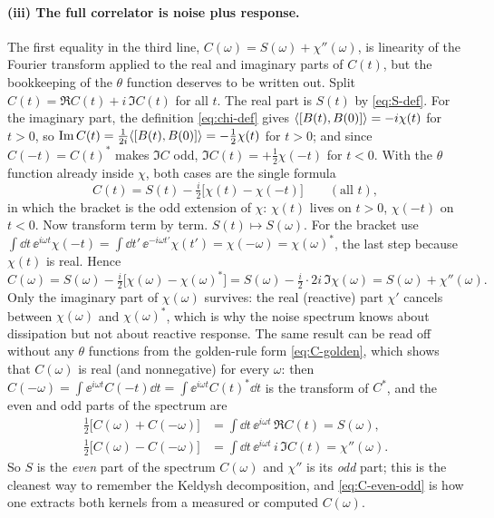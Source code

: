 \paragraph{(iii) The full correlator is noise plus response.}
The first equality in the third line, $C(\omega)=S(\omega)+\chi''(\omega)$, is linearity of the Fourier transform applied to the real and imaginary parts of $C(t)$, but the bookkeeping of the $\theta$ function deserves to be written out.
Split $C(t)=\Re C(t)+i\,\Im C(t)$ for all $t$.
The real part is $S(t)$ by \cref{eq:S-def}.
For the imaginary part, the definition \eqref{eq:chi-def} gives $\langle[B(t),B(0)]\rangle=-i\chi(t)$ for $t>0$, so $\operatorname{Im} C(t)=\tfrac{1}{2i}\langle[B(t),B(0)]\rangle=-\tfrac12\chi(t)$ for $t>0$; and since $C(-t)=C(t)^*$ makes $\Im C$ odd, $\Im C(t)=+\tfrac12\chi(-t)$ for $t<0$.
With the $\theta$ function already inside $\chi$, both cases are the single formula
\begin{equation}
  C(t)=S(t)-\tfrac i2\big[\chi(t)-\chi(-t)\big]\qquad(\text{all }t),
  \label{eq:C-split}
\end{equation}
in which the bracket is the odd extension of $\chi$: $\chi(t)$ lives on $t>0$, $\chi(-t)$ on $t<0$.
Now transform term by term.
$S(t)\mapsto S(\omega)$.
For the bracket use $\int\dd t\,\ee^{i\omega t}\chi(-t)=\int\dd t'\,\ee^{-i\omega t'}\chi(t')=\chi(-\omega)=\chi(\omega)^*$, the last step because $\chi(t)$ is real.
Hence
\begin{equation}
  C(\omega)=S(\omega)-\tfrac i2\big[\chi(\omega)-\chi(\omega)^*\big]=S(\omega)-\tfrac i2\cdot2i\,\Im\chi(\omega)=S(\omega)+\chi''(\omega).
\end{equation}
Only the imaginary part of $\chi(\omega)$ survives: the real (reactive) part $\chi'$ cancels between $\chi(\omega)$ and $\chi(\omega)^*$, which is why the noise spectrum knows about dissipation but not about reactive response.
The same result can be read off without any $\theta$ functions from the golden-rule form \eqref{eq:C-golden}, which shows that $C(\omega)$ is real (and nonnegative) for every $\omega$: then $C(-\omega)=\int\ee^{i\omega t}C(-t)\dd t=\int\ee^{i\omega t}C(t)^*\dd t$ is the transform of $C^*$, and the even and odd parts of the spectrum are
\begin{equation}
\begin{aligned}
  \tfrac12\big[C(\omega)+C(-\omega)\big]&=\int\!\dd t\,\ee^{i\omega t}\,\Re C(t)=S(\omega),\\
  \tfrac12\big[C(\omega)-C(-\omega)\big]&=\int\!\dd t\,\ee^{i\omega t}\,i\,\Im C(t)=\chi''(\omega).
\end{aligned}
  \label{eq:C-even-odd}
\end{equation}
So $S$ is the \emph{even} part of the spectrum $C(\omega)$ and $\chi''$ is its \emph{odd} part; this is the cleanest way to remember the Keldysh decomposition, and \cref{eq:C-even-odd} is how one extracts both kernels from a measured or computed $C(\omega)$.

